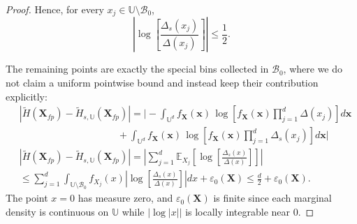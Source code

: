 \documentclass[10pt,a4paper]{amsart}
\newcommand{\Esub}[2]{\mathbb{E}_{#2}\left[ #1 \right]}
\newcommand{\abs}[1]{\left| #1 \right|}
\newcommand{\bracket}[1]{\left[ #1 \right]}
\begin{document}
\begin{proof}
Hence, for every $x_j\in \mathbb U\setminus \mathcal B_{0}$,
\begin{equation}
\abs{\log\bracket{\frac{\Delta_s(x_j)}{\Delta(x_j)}}} \leq \frac{1}{2}.
\end{equation}

The remaining points are exactly the special bins collected in $\mathcal B_{0}$, where we do not claim a uniform pointwise bound and instead keep their contribution explicitly:
\begin{equation}
\begin{aligned}
&\left|
\tilde H(\mathbf X_{fp}) - \tilde H_{s,\mathbb U}(\mathbf X_{fp}) \right| = \Bigg | -\int_{\mathbb U^d} f_{\mathbf X}(\mathbf x)\,\log\left[f_{\mathbf X}(\mathbf x)\prod_{j=1}^d \Delta(x_j)\right]d\mathbf x  \\ & \qquad \qquad \qquad \qquad \qquad
+ \int_{\mathbb U^d} f_{\mathbf X}(\mathbf x)\,\log\left[f_{\mathbf X}(\mathbf x)\prod_{j=1}^d \Delta_s(x_j)\right]d\mathbf x \Bigg |\\
&\left|
\tilde H(\mathbf X_{fp}) - \tilde H_{s,\mathbb U}(\mathbf X_{fp}) \right| = \abs{\sum_{j=1}^{d} \Esub{\log\bracket{\frac{\Delta_s(x)}{\Delta(x)}}}{X_j}} \\
&\leq\sum_{j=1}^{d} \int_{\mathbb U\setminus \mathcal B_{0}} f_{X_j}(x) \abs{\log\bracket{\frac{\Delta_s(x)}{\Delta(x)}}}dx + \varepsilon_{0}(\mathbf X) \leq\frac d2 + \varepsilon_{0}(\mathbf X).
\end{aligned}
\end{equation}
The point $x=0$ has measure zero, and $\varepsilon_{0}(\mathbf X)$ is finite since each marginal density is continuous on $\mathbb U$ while $|\log|x||$ is locally integrable near $0$.
\end{proof}
\end{document}
